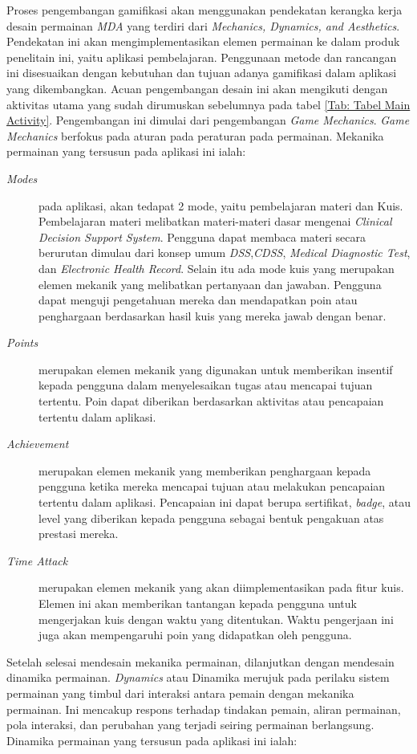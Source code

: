 Proses pengembangan gamifikasi akan menggunakan pendekatan kerangka kerja desain permainan \textit{MDA} yang terdiri dari \textit{Mechanics, Dynamics, and Aesthetics}. 
Pendekatan ini akan mengimplementasikan elemen permainan ke dalam produk penelitain ini, yaitu aplikasi pembelajaran.
Penggunaan metode dan rancangan ini disesuaikan dengan kebutuhan dan tujuan adanya gamifikasi dalam aplikasi yang dikembangkan.
Acuan pengembangan desain ini akan mengikuti dengan aktivitas utama yang sudah dirumuskan sebelumnya pada tabel \ref*{Tab: Tabel Main Activity}.
Pengembangan ini dimulai dari pengembangan \textit{Game Mechanics}.
\newpage
\textit{Game Mechanics} berfokus pada aturan pada peraturan pada permainan. Mekanika permainan yang tersusun pada aplikasi ini ialah:
\begin{description}
	\item[\textit{Modes}]
	pada aplikasi, akan tedapat 2 mode, yaitu pembelajaran materi dan Kuis.
	Pembelajaran materi melibatkan materi-materi dasar mengenai \textit{Clinical Decision Support System}. Pengguna dapat membaca materi secara berurutan dimulau dari konsep umum \textit{DSS},\textit{CDSS}, \textit{Medical Diagnostic Test}, dan \textit{Electronic Health Record}.
	Selain itu ada mode kuis yang
	merupakan elemen mekanik yang melibatkan pertanyaan dan jawaban. Pengguna dapat menguji pengetahuan mereka dan mendapatkan poin atau penghargaan berdasarkan hasil kuis yang mereka jawab dengan benar.
	\item[\textit{Points}] merupakan elemen mekanik yang digunakan untuk memberikan insentif kepada pengguna dalam menyelesaikan tugas atau mencapai tujuan tertentu. Poin dapat diberikan berdasarkan aktivitas atau pencapaian tertentu dalam aplikasi.
	\item[\textit{Achievement}] merupakan elemen mekanik yang memberikan penghargaan kepada pengguna ketika mereka mencapai tujuan atau melakukan pencapaian tertentu dalam aplikasi. Pencapaian ini dapat berupa sertifikat, \textit{badge}, atau level yang diberikan kepada pengguna sebagai bentuk pengakuan atas prestasi mereka.
	\item[\textit{Time Attack}] merupakan elemen mekanik yang akan diimplementasikan pada fitur kuis. Elemen ini akan memberikan tantangan kepada pengguna untuk mengerjakan kuis dengan waktu yang ditentukan. Waktu pengerjaan ini juga akan mempengaruhi poin yang didapatkan oleh pengguna.
\end{description}
Setelah selesai mendesain mekanika permainan, dilanjutkan dengan mendesain dinamika permainan. \textit{Dynamics} atau Dinamika merujuk pada perilaku sistem permainan yang timbul dari interaksi antara pemain dengan mekanika permainan. Ini mencakup respons terhadap tindakan pemain, aliran permainan, pola interaksi, dan perubahan yang terjadi seiring permainan berlangsung. Dinamika permainan yang tersusun pada aplikasi ini ialah: 
